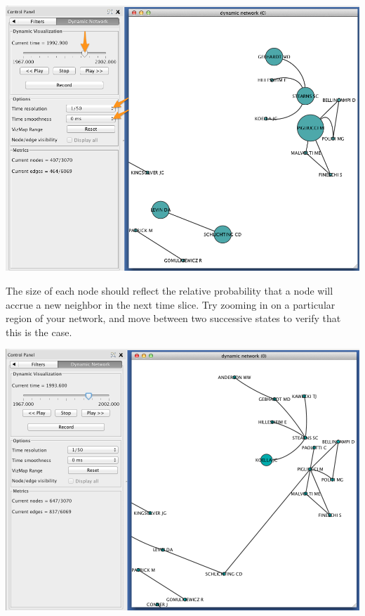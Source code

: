 \documentclass[letterpaper,10pt,english]{sphinxmanual}
\begin{document}
{\hfill\includegraphics{coauthors.37.png}\hfill}

The size of each node should reflect the relative probability that a node will accrue a
new neighbor in the next time slice. Try zooming in on a particular region of your
network, and move between two successive states to verify that this is the case.

{\hfill\includegraphics{coauthors.38.png}\hfill}
\end{document}
